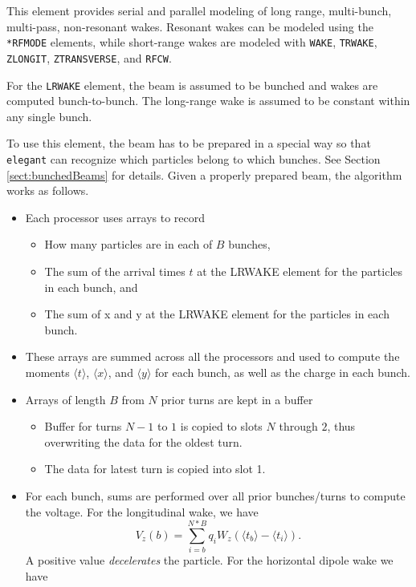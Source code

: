 This element provides serial and parallel modeling of long range, multi-bunch, multi-pass, non-resonant wakes.
Resonant wakes can be modeled using the \verb|*RFMODE| elements, while short-range wakes are modeled with
\verb|WAKE|, \verb|TRWAKE|, \verb|ZLONGIT|, \verb|ZTRANSVERSE|, and \verb|RFCW|.

For the \verb|LRWAKE| element, the beam is assumed to be bunched and wakes are computed bunch-to-bunch.
The long-range wake is assumed to be constant within any single bunch.

To use this element, the beam has to be prepared in a special way so that {\tt elegant} can recognize which
particles belong to which bunches.
See Section \ref{sect:bunchedBeams} for details.
Given a properly prepared beam, the algorithm works as follows.
\begin{itemize}
\item Each processor uses arrays to record
\begin{itemize}
  \item How many particles are in each of $B$ bunches,
  \item The sum of the arrival times $t$ at the LRWAKE element for the particles in each bunch, and
  \item The sum of x and y at the LRWAKE element for the particles in each bunch.
  \end{itemize}
\item These arrays are summed across all the processors and used to compute the moments
  $\langle t \rangle$, $\langle x \rangle$, and $\langle y \rangle$ for each bunch, as
  well as the charge in each bunch.
\item Arrays of length $B$ from $N$ prior turns are kept in a buffer
  \begin{itemize}
  \item Buffer for turns $N-1$ to $1$ is copied to slots $N$ through $2$, thus overwriting the data for
    the oldest turn.
  \item The data for latest turn is copied into slot 1.
  \end{itemize}
\item  For each bunch, sums are performed over all prior bunches/turns to compute the voltage. For the 
  longitudinal wake, we have
  \begin{equation}
    V_z(b) = \sum\limits_{i=b}^{N*B} q_i W_z(\langle t_b \rangle - \langle t_i \rangle).
  \end{equation}
A positive value {\em decelerates} the particle.
For the horizontal dipole wake we have

\end{itemize}
